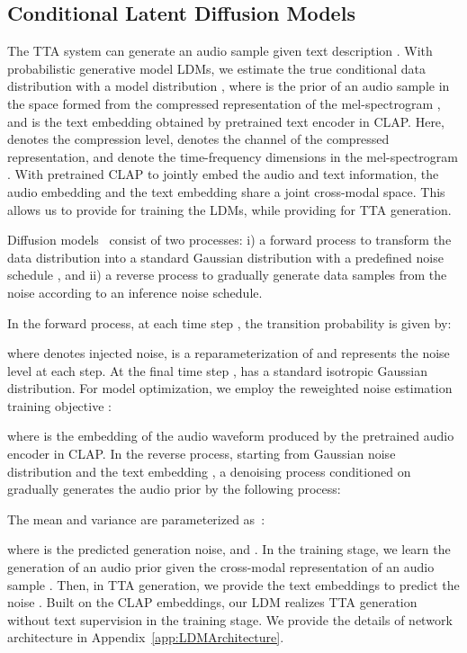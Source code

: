 \documentclass{article}
\begin{document}
\subsection{Conditional Latent Diffusion Models}
\label{CLDMs}

The TTA system can generate an audio sample  given text description . With probabilistic generative model LDMs, we estimate the true conditional data distribution  with a model distribution , where  is the prior of an audio sample  in the space formed from the compressed representation of the mel-spectrogram , and  is the text embedding obtained by pretrained text encoder  in CLAP. Here,  denotes the compression level,  denotes the channel of the compressed representation,  and  denote the time-frequency dimensions in the mel-spectrogram . With pretrained CLAP to jointly embed the audio and text information, the audio embedding  and the text embedding  share a joint cross-modal space. This allows us to provide  for training the LDMs, while providing  for TTA generation.

Diffusion models~\cite{DDPM, SGM} consist of two processes: i) a forward process to transform the data distribution into a standard Gaussian distribution with a predefined noise schedule , and ii) a reverse process to gradually generate data samples from the noise according to an inference noise schedule. 

In the forward process, at each time step , the transition probability is given by:
 
where  denotes injected noise,  is a reparameterization of  and  represents the noise level at each step. 
At the final time step ,  has a standard isotropic Gaussian distribution.
For model optimization, we employ the reweighted noise estimation training objective \cite{DDPM,DiffWave,rombach2022high}:

where  is the embedding of the audio waveform  produced by the pretrained audio encoder  in CLAP. In the reverse process, starting from Gaussian noise distribution  and the text embedding , a denoising process conditioned on  gradually generates the audio prior  by the following process:

The mean and variance are parameterized as~\cite{DDPM}: 

where  is the predicted generation noise, and . In the training stage, we learn the generation of an audio prior  given the cross-modal representation  of an audio sample . Then, in TTA generation, we provide the text embeddings  to predict the noise . Built on the CLAP embeddings, our LDM realizes TTA generation without text supervision in the training stage. We provide the details of network architecture in Appendix~\ref{app:LDMArchitecture}.
\end{document}
